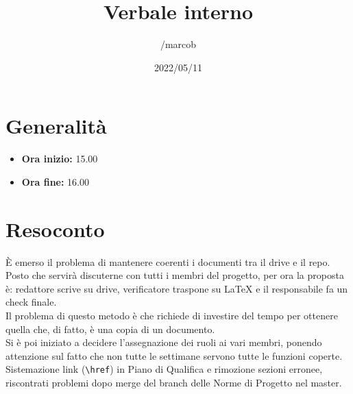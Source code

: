 \documentclass{classes/base}
\title{Verbale interno}
\date{2022/05/11}
\author{/marcob}
\renewcommand{\maketitle}{
    
}
\begin{document}
    \maketitle

    \section*{Generalità}
    \begin{itemize}
        \item \textbf{Ora inizio:} 15.00
        \item \textbf{Ora fine:} 16.00
    \end{itemize}

    \section*{Resoconto}
    È emerso il problema di mantenere coerenti i documenti tra il drive e il repo. Posto che servirà discuterne con tutti i membri del progetto, per ora la proposta è: redattore scrive su drive, verificatore traspone su LaTeX e il responsabile fa un check finale. \\
    Il problema di questo metodo è che richiede di investire del tempo per ottenere quella che, di fatto, è una copia di un documento.\\
    Si è poi iniziato a decidere l'assegnazione dei ruoli ai vari membri, ponendo attenzione sul fatto che non tutte le settimane servono tutte le funzioni coperte.\\
    Sistemazione link (\verb|\href|) in Piano di Qualifica e rimozione sezioni erronee, riscontrati problemi dopo merge del branch delle Norme di Progetto nel master.
\end{document}

